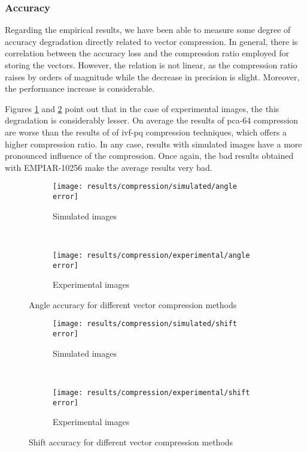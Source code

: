 \documentclass[../main.tex]{subfiles}
\begin{document}
\subsubsection{Accuracy}
Regarding the empirical results, we have been able to measure some degree of accuracy degradation directly related to vector compression. In general, there is correlation between the accuracy loss and the compression ratio employed for storing the vectors. However, the relation is not linear, as the compression ratio raises by orders of magnitude while the decrease in precision is slight. Moreover, the performance increase is considerable.

Figures \ref{fig:5:compression_angle_accuracy} and \ref{fig:5:compression_shift_accuracy} point out that in the case of experimental images, the this degradation is considerably lesser. On average the results of \gls{pca}-64 compression are worse than the results of of \gls{ivf}-\gls{pq} compression techniques, which offers a higher compression ratio. In any case, results with simulated images have a more pronounced influence of the compression. Once again, the bad results obtained with EMPIAR-10256 make the average results very bad. 

\begin{figure}[htbp]
    \centering
    \begin{subfigure}[b]{.8\textwidth}
         \centering
         \texttt{[image: results/compression/simulated/angle error]}
         \caption{Simulated images}
    \end{subfigure}\\
    \vspace{2em}
    \begin{subfigure}[b]{.8\textwidth}
         \centering
         \texttt{[image: results/compression/experimental/angle error]}
         \caption{Experimental images}
    \end{subfigure}
    \caption{Angle accuracy for different vector compression methods}
    \label{fig:5:compression_angle_accuracy}
\end{figure}

\begin{figure}[htbp]
    \centering
    \begin{subfigure}[b]{.8\textwidth}
         \centering
         \texttt{[image: results/compression/simulated/shift error]}
         \caption{Simulated images}
    \end{subfigure}\\
    \vspace{2em}
    \begin{subfigure}[b]{.8\textwidth}
         \centering
         \texttt{[image: results/compression/experimental/shift error]}
         \caption{Experimental images}
    \end{subfigure}
    \caption{Shift accuracy for different vector compression methods}
    \label{fig:5:compression_shift_accuracy}
\end{figure}
\end{document}
